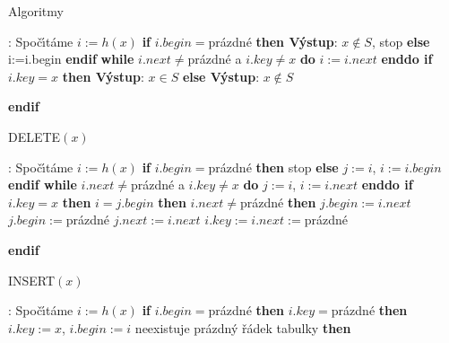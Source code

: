 \subhead
Algoritmy
\endsubhead
\smallskip

:\newline 
Spo\v c\'\i t\'ame $i:=h(x)$\newline 
{\bf if} $i.begin=$pr\'azdn\'e {\bf then V\'ystup}: $x\notin S$, stop {\bf else} i:=i.begin {\bf endif}\newline 
{\bf while} $i.next\ne$pr\'azdn\'e a $i.key\ne x$ {\bf do} $i:=i.next$ {\bf enddo \newline 
if} $i.key=x$ {\bf then V\'ystup}: $x\in S$ {\bf else V\'ystup}: $
x\notin S$ {\bf endif
\medskip

\flushpar DELETE$(x)$}:\newline 
Spo\v c\'\i t\'ame $i:=h(x)$\newline 
{\bf if} $i.begin=$pr\'azdn\'e {\bf then} stop {\bf else} $j:=i$, $
i:=i.begin$ {\bf endif\newline 
while} $i.next\ne$pr\'azdn\'e a $i.key\ne x$ {\bf do} $j:=i$, $i:=i.next$ {\bf enddo \newline 
if} $i.key=x$ {\bf then}\newline 
\phantom{---}{\bf if} $i=j.begin$ {\bf then}\newline 
\phantom{------}{\bf if} $i.next\ne$pr\'azdn\'e {\bf then}\newline 
\phantom{---------}$j.begin:=i.next$\newline 
\phantom{------}{\bf else}\newline 
\phantom{---------}$j.begin:=$pr\'azdn\'e\newline 
\phantom{------}{\bf endif}\newline 
\phantom{---}{\bf else}\newline 
\phantom{------}$j.next:=i.next$\newline 
\phantom{---}{\bf endif}\newline 
\phantom{---}$i.key:=i.next:=$pr\'azdn\'e\newline
{\bf endif
\medskip

\flushpar INSERT$(x)$}:\newline 
Spo\v c\'\i t\'ame $i:=h(x)$\newline
{\bf if} $i.begin=$pr\'azdn\'e {\bf then}\newline
\phantom{---}{\bf if} $i.key=$pr\'azdn\'e {\bf then}\newline 
\phantom{------}$i.key:=x$, $i.begin:=i$\newline 
\phantom{---}{\bf else}\newline 
\phantom{------}{\bf if} neexistuje pr\'azdn\'y \v r\'adek tabulky {\bf then}\newline 
